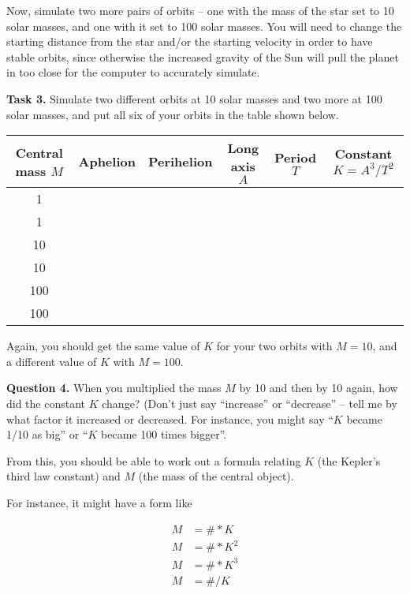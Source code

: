 \documentclass[11pt]{article}
\begin{document}
\bigskip

Now, simulate two more pairs of orbits -- one with the mass of the star set to 10 solar masses, and one with it set to 100 solar masses. You will need to change the starting distance from the star and/or the starting velocity in order to have stable orbits, since otherwise the increased gravity of the Sun will pull the planet in too close for the computer to accurately simulate. 

\newpage
{\bf Task 3.} Simulate two different orbits at 10 solar masses and two more at 100 solar masses, and put all six of your orbits in the table shown below.

\begin{center}
	\large
	\begin{tabular}{|c|c|c|c|c|c|}
		\hline
		Central mass $M$ & Aphelion & Perihelion & Long axis $A$ & Period $T$ & Constant $K = A^3 / T^2$ \\ \hline
		1 & & & & &  \\ \hline
		1 & & & & &  \\ \hline
		10 & & & & &  \\ \hline
		10 & & & & &  \\ \hline
		100 & & & & &  \\ \hline
		100 & & & & &  \\ \hline
	\end{tabular}

\end{center}



Again, you should get the same value of $K$ for your two orbits with $M=10$, and a different value of $K$ with $M=100$.

\bigskip
{\bf Question 4.} When you multiplied the mass $M$ by 10 and then by 10 again, how did the constant $K$ change? (Don’t just say “increase” or “decrease” -- tell me by what factor it increased or decreased. For instance, you might say “$K$ became 1/10 as big” or “$K$ became 100 times bigger”.

\vspace{1in}

From this, you should be able to work out a formula relating $K$ (the Kepler’s third law constant) and $M$ (the mass of the central object).

For instance, it might have a form like

\begin{align*}
M &= \# * K \\
M &= \# * K^2 \\
M &= \# * K^3 \\
M &= \# / K \\
\end{align*}
\end{document}
